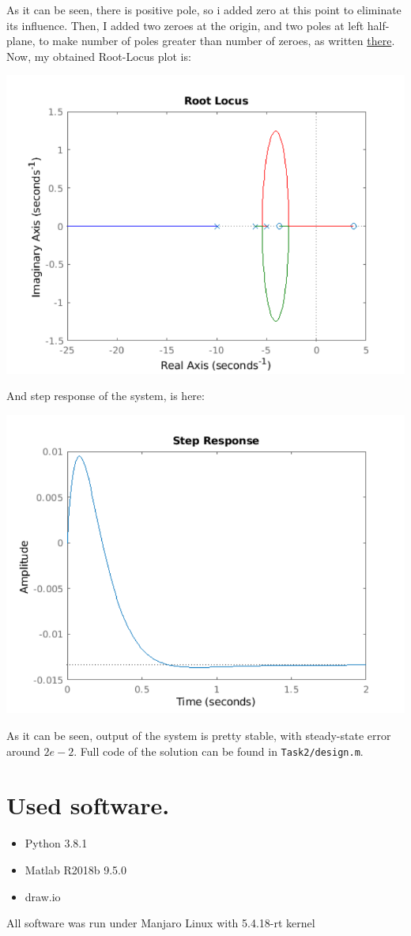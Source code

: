 \documentclass[a4paper,12pt]{article}
\begin{document}
    As it can be seen, there is positive pole, so i added zero at this point to 
    eliminate its influence. Then, I added two zeroes at the origin, and two poles
    at left half-plane, to make number of poles greater than number of zeroes, as 
    written \href{https://en.wikibooks.org/wiki/Control_Systems/Poles_and_Zeros}{there}.
    Now, my obtained Root-Locus plot is:
    \begin{center}
        \includegraphics[width=0.7\linewidth]{../Task2/RLtuned.pdf}
    \end{center}
    And step response of the system, is here:
    \begin{center}
        \includegraphics[width=0.7\linewidth]{../Task2/Step.pdf}
    \end{center}
    As it can be seen, output of the system is pretty stable, with steady-state 
    error around $2{e-2}$. Full code of the solution can be found in 
    \texttt{Task2/design.m}.
\section{Used software.}
\begin{itemize}
    \item Python 3.8.1
    \item Matlab R2018b 9.5.0
    \item draw.io
\end{itemize}
All software was run under Manjaro Linux with 5.4.18-rt kernel
\end{document}
